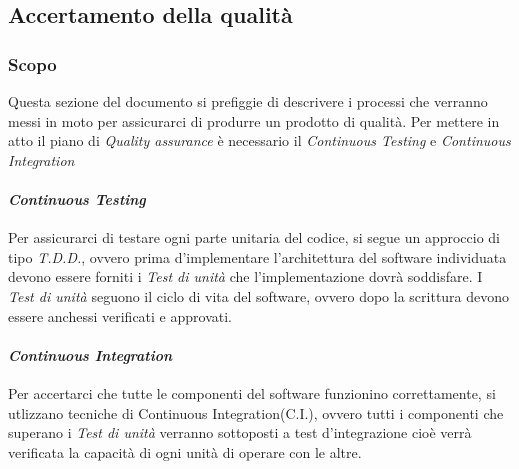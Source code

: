 \subsection{Accertamento della qualit\` a}
\subsubsection{Scopo}
Questa sezione del documento si prefiggie di descrivere i processi che verranno
messi in moto per assicurarci di produrre un prodotto di qualità.
Per mettere in atto il piano di \textit{Quality assurance\glo} è necessario il
\textit{Continuous Testing\glo} e \textit{Continuous Integration\glo}

\paragraph{\textit{Continuous Testing\glo}}
Per assicurarci di testare ogni parte unitaria del codice, si segue un approccio
di tipo \textit{T.D.D.\glo}, ovvero prima d'implementare l'architettura del software
individuata devono essere forniti i \textit{Test di unità\glo} che l'implementazione dovrà soddisfare.
I \textit{Test di unità\glo} seguono il ciclo di vita del software, ovvero dopo la
scrittura devono essere anchessi verificati e approvati.

\paragraph{\textit{Continuous Integration\glo}}
Per accertarci che tutte le componenti del software funzionino correttamente, si
utlizzano tecniche di Continuous Integration(C.I.), ovvero tutti i componenti che
superano i \textit{Test di unità\glo} verranno sottoposti a test d'integrazione
cioè verrà verificata la capacità di ogni unità di operare con le altre.
